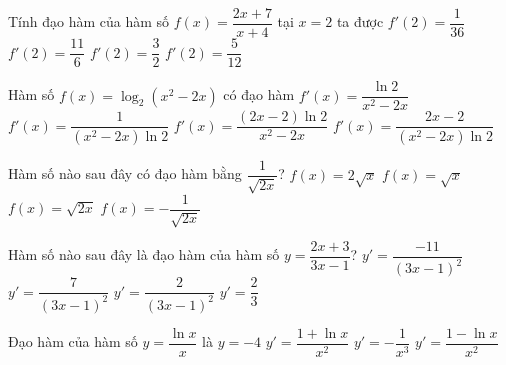\begin{ex}%
	Tính đạo  hàm của hàm số $f(x)=\dfrac{2x+7}{x+4}$ tại $x=2$ ta được
	 \choice
		 {\True $f'(2)=\dfrac{1}{36}$}
		{$f'(2)=\dfrac{11}{6}$} 
		{$f'(2)=\dfrac{3}{2}$} 
		{$f'(2)=\dfrac{5}{12}$} 
\end{ex}

\begin{ex}%
	Hàm số $f(x)=\log_2 \left(x^2-2x\right)$ có đạo  hàm
	 \choice
		 {$f'(x)=\dfrac{\ln 2}{x^2-2x}$}
		{$f'(x)=\dfrac{1}{\left(x^2-2x\right)\ln  2}$}
		{$f'(x)=\dfrac{\left(2x-2\right)\ln 2}{x^2-2x}$} 
		{\True $f'(x)=\dfrac{2x-2}{\left(x^2-2x\right)\ln  2}$}
\end{ex}

\begin{ex}%
	 Hàm số nào sau đây có đạo hàm bằng $\dfrac{1}{\sqrt{2x}}$?
	\choice 
		{$f(x)=2\sqrt{x}$} 
		 {$f(x)=\sqrt{x}$}
		 {\True $f(x)=\sqrt{2x}$}
		{$f(x)=-\dfrac{1}{\sqrt{2x}}$} 
\end{ex}

\begin{ex}%
	Hàm số nào sau đây là đạo hàm của hàm  số $y=\dfrac{2x+3}{3x-1}$?
	 \choice
		 {\True $y'=\dfrac{-11}{(3x-1)^2}$}
		{$y'=\dfrac{7}{(3x-1)^2}$} 
		 {$y'=\dfrac{2}{(3x-1)^2}$}
		{$y'=\dfrac{2}{3}$} 
\end{ex}

\begin{ex}%
	Đạo hàm của  hàm số $y=\dfrac{\ln x}{x}$ là
	\choice 
		 {$y=-4$}
		{$y'=\dfrac{1+\ln  x}{x^2}$}
		 {$y'=-\dfrac{1}{x^3}$}
		{\True  $y'=\dfrac{1-\ln x}{x^2}$}
\end{ex}

